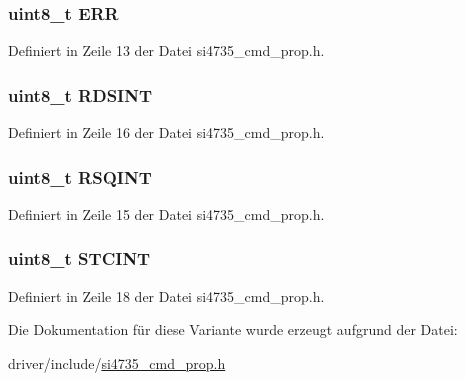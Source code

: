 \subsubsection[{E\+R\+R}]{\setlength{\rightskip}{0pt plus 5cm}uint8\+\_\+t {\bf E\+R\+R}}\label{unionint__status_afb74dff3cfacd68c02883e5282ef2f59}


Definiert in Zeile 13 der Datei si4735\+\_\+cmd\+\_\+prop.\+h.

\hypertarget{unionint__status_a4fac7351844086822dbf634529f6cfbd}{}
\subsubsection[{R\+D\+S\+I\+N\+T}]{\setlength{\rightskip}{0pt plus 5cm}uint8\+\_\+t R\+D\+S\+I\+N\+T}\label{unionint__status_a4fac7351844086822dbf634529f6cfbd}


Definiert in Zeile 16 der Datei si4735\+\_\+cmd\+\_\+prop.\+h.

\hypertarget{unionint__status_a9637ec0bb6d40570ea68a1b96c5d561e}{}
\subsubsection[{R\+S\+Q\+I\+N\+T}]{\setlength{\rightskip}{0pt plus 5cm}uint8\+\_\+t R\+S\+Q\+I\+N\+T}\label{unionint__status_a9637ec0bb6d40570ea68a1b96c5d561e}


Definiert in Zeile 15 der Datei si4735\+\_\+cmd\+\_\+prop.\+h.

\hypertarget{unionint__status_a1026d3a63b328db2451abc49e0bd5a2c}{}
\subsubsection[{S\+T\+C\+I\+N\+T}]{\setlength{\rightskip}{0pt plus 5cm}uint8\+\_\+t S\+T\+C\+I\+N\+T}\label{unionint__status_a1026d3a63b328db2451abc49e0bd5a2c}


Definiert in Zeile 18 der Datei si4735\+\_\+cmd\+\_\+prop.\+h.



Die Dokumentation für diese Variante wurde erzeugt aufgrund der Datei\+:\begin{DoxyCompactItemize}
\item 
driver/include/\hyperlink{si4735__cmd__prop_8h}{si4735\+\_\+cmd\+\_\+prop.\+h}\end{DoxyCompactItemize}
